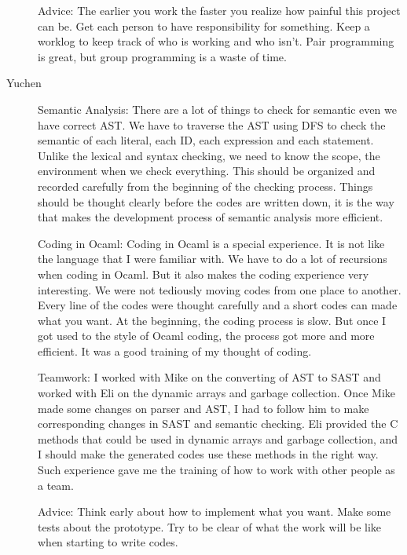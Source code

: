 \documentclass[a4paper]{article}
\begin{document}
\begin{description}
\par Advice: The earlier you work the faster you realize how painful this project can be. Get each person to have responsibility for something. Keep a worklog to keep track of who is working and who isn't. Pair programming is great, but group programming is a waste of time.

\item[Yuchen]
\par Semantic Analysis: There are a lot of things to check for semantic even we have correct AST. We have to traverse the AST using DFS to check the semantic of each literal, each ID, each expression and each statement. Unlike the lexical and syntax checking, we need to know the scope, the environment when we check everything. This should be organized and recorded carefully from the beginning of the checking process. Things should be thought clearly before the codes are written down, it is the way that makes the development process of semantic analysis more efficient.

\par Coding in Ocaml: Coding in Ocaml is a special experience. It is not like the language that I were familiar with. We have to do a lot of recursions when coding in Ocaml. But it also makes the coding experience very interesting. We were not tediously moving codes from one place to another. Every line of the codes were thought carefully and a short codes can made what you want. At the beginning, the coding process is slow. But once I got used to the style of Ocaml coding, the process got more and more efficient. It was a good training of my thought of coding.

\par Teamwork: I worked with Mike on the converting of AST to SAST and worked with Eli on the dynamic arrays and garbage collection. Once Mike made some changes on parser and AST, I had to follow him to make corresponding changes in SAST and semantic checking. Eli provided the C methods that could be used in dynamic arrays and garbage collection, and I should make the generated codes use these methods in the right way. Such experience gave me the training of how to work with other people as a team.  

\par Advice: Think early about how to implement what you want. Make some tests about the prototype. Try to be clear of what the work will be like when starting to write codes.



\end{description}
\end{document}
